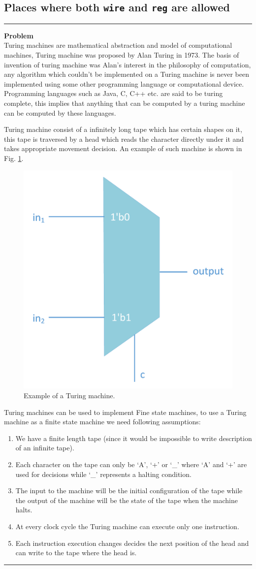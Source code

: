 \documentclass[a4paper,10pt]{article}
\theoremstyle{mytheor}
\newcounter{problemNumber}
\newcommand {
  \insertProblem}[1]{
  \vspace{0.5cm}
  \hrule
  \vspace{0.3cm}

  {\color{greatblue}\textbf{\large{Problem \theproblemNumber}}}
  \vspace{2pt}\\#1

  \addtocounter{problemNumber}{1}
  \vspace{0.2cm}
  \hrule  
  \vspace{0.5cm}
}
\begin{document}
 \subsection{Places where both \lstinline[style=verilog-inline-style]{wire} and \lstinline[style=verilog-inline-style]{reg} are allowed}


 \insertProblem { Turing machines are mathematical abstraction and
   model of computational machines, Turing machine was proposed by
   Alan Turing in 1973. The basis of invention of turing machine was
   Alan's interest in the philosophy of computation, any algorithm
   which couldn't be implemented on a Turing machine is never been
   implemented using some other programming language or computational
   device. Programming languages such as Java, C, C++ etc. are said to
   be turing complete, this implies that anything that can be computed
   by a turing machine can be computed by these languages.

   Turing machine consist of a infinitely long tape which has certain
   shapes on it, this tape is traversed by a head which reads the
   character directly under it and takes appropriate movement
   decision. An example of such machine is shown in
   Fig. \ref{Fig:turing-machine-example}.

  \begin{figure}[!h] \centering  
    \includegraphics[width=0.3\linewidth]{./resources/multiplexer.pdf} 
    \caption{Example of a Turing machine.} 
    \label{Fig:turing-machine-example} 
  \end{figure}

  Turing machines can be used to implement Fine state machines, to use
  a Turing machine as a finite state machine we need following
  assumptions:
  \begin{enumerate}
  \item We have a finite length tape (since it would be impossible
    to write description of an infinite tape).
  \item Each character on the tape can only be `A', `+' or `\_' where
    `A' and `+' are used for decisions while `\_' represents a
    halting condition.
  \item The input to the machine will be the initial configuration
    of the tape while the output of the machine will be the state of
    the tape when the machine halts.
  \item At every clock cycle the Turing machine can execute only one
    instruction.
  \item Each instruction execution changes decides the next position
    of the head and can write to the tape where the head is.
  \end{enumerate}

}
\end{document}
